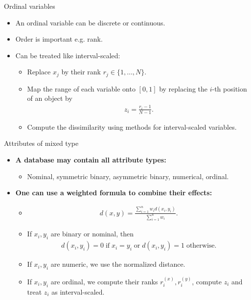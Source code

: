 \documentclass[aspectratio=169,t]{beamer}
\begin{document}
  { 
    \begin{frame}{Ordinal variables}
    \begin{itemize}
      \item An ordinal variable can be discrete or continuous.
      \item Order is important e.g. rank.
      \item Can be treated like interval-scaled:
      \begin{itemize}
        \item Replace $x_j$ by their rank $r_j \in \{1, \ldots, N \}$.
        \item Map the range of each variable onto $[0,1]$ by replacing the $i$-th position of an object by
        \begin{align}
        z_{i} = \frac{r_{i}-1}{N-1}.
        \end{align}
        \item Compute the dissimilarity using methods for interval-scaled variables.
      \end{itemize}
    \end{itemize}
    \end{frame}
  }

  { 
    \begin{frame}{Attributes of mixed type}
    \begin{itemize}
      \item \textbf{A database may contain all attribute types:}
      \begin{itemize}
          \item Nominal, symmetric binary, asymmetric binary, numerical, ordinal.
      \end{itemize}
      \item \textbf{One can use a weighted formula to combine their effects:}
      \begin{itemize}
        \item \begin{align}
          d(x,y) = \frac{\sum_{i=1}^{n} w_{i}d(x_i,y_i)}{\sum_{i=1}^{n} w_i}.
        \end{align}
        \item If $x_i,y_i$ are binary or nominal, then
        \begin{align}
          d(x_i,y_i) = 0 \; \text{if} \; x_i = y_i \; \text{or} \; d(x_i,y_i) = 1 \; \text{otherwise}.
        \end{align}
        \item If $x_i,y_i$ are numeric, we use the normalized distance.
        \item If $x_i,y_i$ are ordinal, we compute their ranks $r^{(x)}_i,r^{(y)}_i$, compute $z_i$ and treat $z_i$ as interval-scaled.
      \end{itemize}
    \end{itemize}
    \end{frame}
  }
\end{document}
